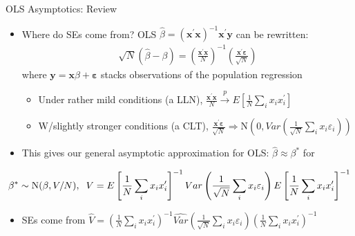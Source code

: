 \documentclass[11pt,english]{beamer}
\begin{document}
\begin{frame}{OLS Asymptotics: Review}

\begin{itemize}
\item Where do SEs come from? OLS $\hat\beta=(\mathbf{x}^\prime\mathbf{x})^{-1}\mathbf{x}^\prime\mathbf{y}$ can be rewritten:
\begin{align*}
\sqrt{N}(\hat\beta - \beta) = \left(\frac{\mathbf{x}^\prime\mathbf{x}}{N}\right)^{-1} \left(\frac{\mathbf{x}^\prime\boldsymbol\varepsilon}{\sqrt{N}}\right)
\end{align*}
where $\mathbf{y}=\mathbf{x}\beta + \boldsymbol{\varepsilon}$ stacks observations of the population regression \smallskip\pause{}
\begin{itemize}
\item Under rather mild conditions (a LLN), $\frac{\mathbf{x}^\prime\mathbf{x}}{N}\xrightarrow{p}E\left[\frac{1}{N}\sum_i x_ix_i^\prime\right]$\smallskip\pause{}
\item W/slightly stronger conditions (a CLT), $\frac{\mathbf{x}^\prime\boldsymbol\varepsilon}{\sqrt{N}}\Rightarrow \mathrm{N}(0,Var(\frac{1}{\sqrt{N}}\sum_i x_i\varepsilon_i))$
\end{itemize}\medskip\pause{}
\item This gives our general asymptotic approximation for OLS: $\hat\beta\approx\beta^*$ for
\end{itemize}
\begin{align*}
\beta^* \sim \mathrm{N}(\beta,V/N),\hspace{0.2cm} V=E\left[\frac{1}{N}\sum_i x_ix_i^\prime\right]^{-1} Var\left(\frac{1}{\sqrt{N}}\sum_i x_i\varepsilon_i\right) E\left[\frac{1}{N}\sum_i x_ix_i^\prime\right]^{-1}
\end{align*}\pause{}
\begin{itemize}
\item SEs come from $\hat{V}=\left(\frac{1}{N}\sum_i x_ix_i^\prime\right)^{-1} \widehat{Var}\left(\frac{1}{\sqrt{N}}\sum_i x_i\varepsilon_i\right) \left(\frac{1}{N}\sum_i x_ix_i^\prime\right)^{-1}$
\end{itemize}
\end{frame}
\end{document}
